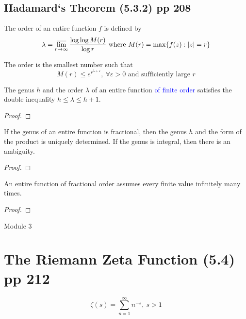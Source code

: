 \subsection{Hadamard`s Theorem (5.3.2) pp 208}
\begin{definition}[Order]
	The order of an entire function $f$ is defined by
	\begin{equation}
		\lambda = \varlimsup_{r \to \infty} \frac{\log \log M(r)}{\log r} \text{ where } M(r) = \max \{ f(z) : |z| = r\}
	\end{equation}
\end{definition}
\begin{remark}
	The order is the smallest number such that
	\begin{equation}
		M(r) \le e^{r^{\lambda+\varepsilon}},\ \forall \varepsilon > 0 \text{ and sufficiently large } r
	\end{equation}
\end{remark}

\begin{theorem}
	The genus $h$ and the order $\lambda$ of an entire function \textcolor{blue}{of finite order} satisfies the double inequality $h \le \lambda \le h+1$.
\end{theorem}
\begin{proof}
\end{proof}

\begin{remark}
	If the genus of an entire function is fractional, then the genus $h$ and the form of the product is uniquely determined.
	If the genus is integral, then there is an ambiguity.
\end{remark}
\begin{proof}
\end{proof}

\begin{corollary}
	An entire function of fractional order assumes every finite value infinitely many times.
\end{corollary}
\begin{proof}
\end{proof}

\pagebreak
{\Large Module 3}
\section{The Riemann Zeta Function (5.4) pp 212}
\begin{definition}
\begin{equation}
	\zeta(s) = \sum_{n=1}^\infty n^{-s},\ s > 1
\end{equation}
\end{definition}

